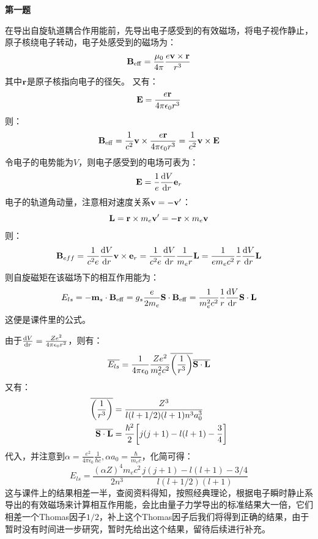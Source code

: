 \documentclass[12pt, a4paper, oneside]{ctexart}
\begin{document}
	\begin{center}
		\textbf{第一题}
	\end{center}
	
	在导出自旋轨道耦合作用能前，先导出电子感受到的有效磁场，将电子视作静止，原子核绕电子转动，电子处感受到的磁场为：
	\begin{equation}
		\vb{B}_{\mathrm{eff}} = \frac{\mu_0 }{4 \pi }  \frac{e \vb{v} \times \vb{r}}{r^3}
	\end{equation}
	其中$\vb{r}$是原子核指向电子的径矢。
	又有：
	\begin{equation*}
		\vb{E} = \frac{e\vb{r}}{4\pi \epsilon_0 r^3}
	\end{equation*}
	则：
	\begin{equation}
		\vb{B}_{\mathrm{eff}} = \frac{1}{c^2} \vb{v} \times \frac{e\vb{r}}{4\pi \epsilon_0 r^3} = \frac{1}{c^2} \vb{v} \times \vb{E}
	\end{equation}
	令电子的电势能为$V$，则电子感受到的电场可表为：
	\begin{equation}
		\vb{E} = \frac{1}{e} \dv{V}{r} \vb{e}_r
	\end{equation}
	电子的轨道角动量，注意相对速度关系$\vb{v} = -\vb{v'}$：
	\begin{equation}
		\vb{L} = \vb{r} \times m_e \vb{v'} = -\vb{r} \times m_e \vb{v}
	\end{equation}
	则：
	\begin{equation}
		\vb{B}_{eff} = \frac{1}{c^2 e} \dv{V}{r} \vb{v} \times \vb{e}_r = \frac{1}{c^2 e} \dv{V}{r} \frac{1}{m_e r} \vb{L} = \frac{1}{e m_e c^2} \frac{1}{r} \dv{V}{r} \vb{L}
	\end{equation}
	则自旋磁矩在该磁场下的相互作用能为：
	\begin{equation}
		E_{ls} = -\vb{m}_{s} \cdot \vb{B}_{\mathrm{eff}} = g_s \frac{e}{2 m_e} \vb{S} \cdot \vb{B}_{\mathrm{eff}} = \frac{1}{m^2_e c^2} \frac{1}{r} \dv{V}{r} \vb{S} \cdot \vb{L}
	\end{equation}
	这便是课件里的公式。
	
	由于$\dv{V}{r} = \frac{Ze^2}{4\pi \epsilon_0 r^2}$，则有：
	\begin{equation}
		\overline{E_{ls}} = \frac{1}{4\pi \epsilon_0} \frac{Ze^2}{m^2_e c^2} \overline{\qty(\frac{1}{r^3})} \overline{\vb{S}\cdot\vb{L}}
	\end{equation} 
	又有：
	\begin{align*}
		\overline{\qty(\frac{1}{r^3})} &= \frac{Z^3}{l(l+1/2)(l+1)n^3a_0^3} \\
		\overline{\vb{S}\cdot\vb{L}} &= \frac{\hbar^2}{2} \qty[j(j+1) - l(l+1) -\frac{3}{4}]
	\end{align*}
	代入，并注意到$\alpha = \frac{e^2}{4\pi\epsilon_0} \frac{1}{\hbar c},\alpha a_0 = \frac{\hbar}{m_e c}$，化简可得：
	\begin{equation}
		E_{ls} = \frac{(\alpha Z)^4 m_e c^2}{2 n^3} \frac{j(j+1) - l(l+1) -3/4}{l(l+1/2)(l+1)}
	\end{equation}
	这与课件上的结果相差一半，查阅资料得知，按照经典理论，根据电子瞬时静止系导出的有效磁场来计算相互作用能，会比由量子力学导出的标准结果大一倍，它们相差一个Thomas因子$1/2$，补上这个Thomas因子后我们将得到正确的结果，由于暂时没有时间进一步研究，暂时先给出这个结果，留待后续进行补充。
	
\end{document}
